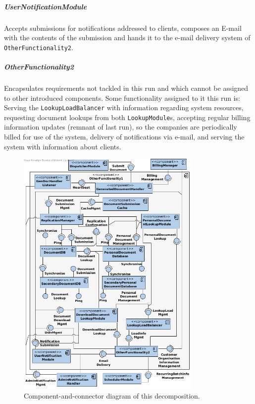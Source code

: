 \documentclass[a4paper,10pt]{article}
\begin{document}
\subparagraph{UserNotificationModule}
Accepts submissions for notifications addressed to clients, composes an E-mail with the contents of the submission and hands it to the e-mail delivery system of \texttt{OtherFunctionality2}.

\subparagraph{OtherFunctionality2}
Encapsulates requirements not tackled in this run and which cannot be assigned to other introduced components. Some functionality assigned to it this run is: Serving the \texttt{LookupLoadBalancer} with information regarding system resources, requesting document lookups from both \texttt{LookupModule}s, accepting regular billing information updates (remnant of last run), so the companies are periodically billed for use of the system, delivery of notifications via e-mail, and serving the system with information about clients. 

\begin{figure}[!htp]
    \centering
    \includegraphics[width=0.8\textwidth]{comp_diag_2.png}
    \caption{Component-and-connector diagram of this decomposition.
        }\label{fig:it2-cc_main}
\end{figure}
\end{document}
